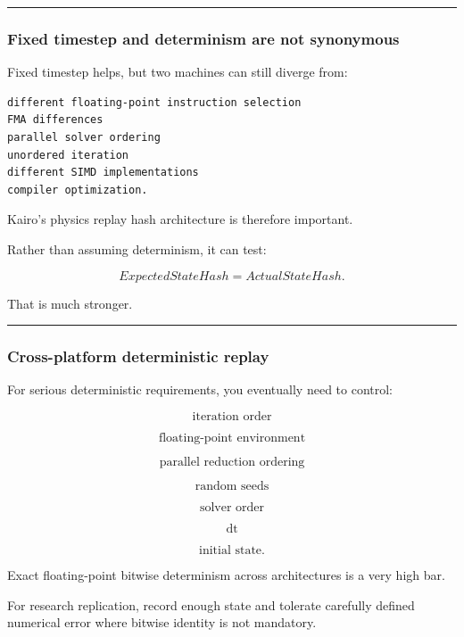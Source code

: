 \begin{center}\rule{0.5\linewidth}{0.5pt}\end{center}

\subsubsection{Fixed timestep and determinism are not synonymous}\label{fixed-timestep-and-determinism-are-not-synonymous}

Fixed timestep helps, but two machines can still diverge from:

\begin{verbatim}
different floating-point instruction selection
FMA differences
parallel solver ordering
unordered iteration
different SIMD implementations
compiler optimization.
\end{verbatim}

Kairo's physics replay hash architecture is therefore important.

Rather than assuming determinism, it can test:

\[
ExpectedStateHash
=
ActualStateHash.
\]

That is much stronger.

\begin{center}\rule{0.5\linewidth}{0.5pt}\end{center}

\subsubsection{Cross-platform deterministic replay}\label{cross-platform-deterministic-replay}

For serious deterministic requirements, you eventually need to control:

\[
\text{iteration order}
\]

\[
\text{floating-point environment}
\]

\[
\text{parallel reduction ordering}
\]

\[
\text{random seeds}
\]

\[
\text{solver order}
\]

\[
\text{dt}
\]

\[
\text{initial state}.
\]

Exact floating-point bitwise determinism across architectures is a very high bar.

For research replication, record enough state and tolerate carefully defined numerical error where bitwise identity is not mandatory.

